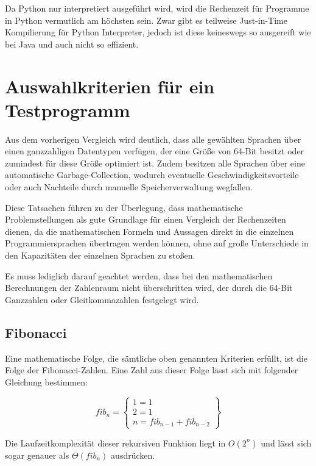 \documentclass[11pt, parskip=half]{scrartcl}       %
\begin{document}
Da Python nur interpretiert ausgeführt wird, wird die Rechenzeit für Programme in Python vermutlich am höchsten sein.
Zwar gibt es teilweise Just-in-Time Kompilierung für Python Interpreter, jedoch ist diese keineswegs so ausgereift wie bei Java und auch nicht so effizient.


\section{Auswahlkriterien für ein Testprogramm}

Aus dem vorherigen Vergleich wird deutlich, dass alle gewählten Sprachen über einen ganzzahligen Datentypen verfügen, der eine Größe von 64-Bit besitzt oder zumindest für diese Größe optimiert ist.
Zudem besitzen alle Sprachen über eine automatische Garbage-Collection, wodurch eventuelle Geschwindigkeitsvorteile oder auch Nachteile durch manuelle Speicherverwaltung wegfallen.

Diese Tatsachen führen zu der Überlegung, dass mathematische Problemstellungen als gute Grundlage für einen Vergleich der Rechenzeiten dienen, da die mathematischen Formeln und Aussagen direkt in die einzelnen Programmiersprachen übertragen werden können, ohne auf große Unterschiede in den Kapazitäten der einzelnen Sprachen zu stoßen.

Es muss lediglich darauf geachtet werden, dass bei den mathematischen Berechnungen der Zahlenraum nicht überschritten wird, der durch die 64-Bit Ganzzahlen oder Gleitkommazahlen festgelegt wird.


\subsection{Fibonacci}

Eine mathematische Folge, die sämtliche oben genannten Kriterien erfüllt, ist die Folge der Fibonacci-Zahlen.
Eine Zahl aus dieser Folge lässt sich mit folgender Gleichung bestimmen:

$$
fib _{n} = \left.
  \begin{cases}
    1 = 1 \\
    2 = 1 \\
    n = fib_{n-1} + fib_{n-2}
  \end{cases}
\right\}
$$

Die Laufzeitkomplexität dieser rekursiven Funktion liegt in $O(2^{n})$ und lässt sich sogar genauer als $\Theta(fib_{n})$ ausdrücken.
\end{document}
